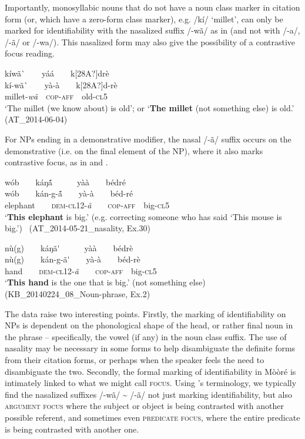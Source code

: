 \documentclass[output=paper]{langsci/langscibook}
\begin{document}
Importantly, monosyllabic nouns that do not have a noun class marker in citation form (or, which have a zero-form class marker), e.g. /kí/ ‘millet’, can only be marked for identifiability with the nasalized suffix /-wã/ as in  (and not with /-a/, /-\~{a}/ or /-wa/). This nasalized form may also give the possibility of a contrastive focus reading.

\ea\label{ex:teo:52}
\label{bkm:Ref264214273}kíw\~{a}\`{ }\ \ \ \ y\'{a}\'{a}\ \ \ \ k[28A?]drè\\
\gll kí\nobreakdash-w\~{a}\`{ }\ \ \ \ y\`{a}-\`{a}\ \ \ \ k[28A?]d\nobreakdash-rè\\
millet\nobreakdash-\textit{wã}\textsc{\ \ cop-aff}\ \ old\nobreakdash-\textsc{cl5}\\
\glt ‘The millet (we know about) is old’; or ‘\textbf{The millet} (not something else) is old.’ (AT\_2014-06-04)
\z

For NPs ending in a demonstrative modifier, the nasal /-ã/ suffix occurs on the demonstrative (i.e. on the final element of the NP), where it also marks contrastive focus, as in  and .

\ea\label{ex:teo:53}
\label{bkm:Ref264214282}wób\ \ \ \ káŋ\'{ã}\ \ \ \ \ \ y\`{a}\`{a}\ \ \ \ bédré\\
\gll wób\ \ \ \ kán\nobreakdash-g\nobreakdash-\'{ã}\ \ \ \ y\`{a}-\`{a}\ \ \ \ béd\nobreakdash-ré\\
elephant\ \ \ \ \textsc{dem-cl12}{}-\textit{ã}\ \ \ \ \textsc{cop-aff}\ \ big\nobreakdash-\textsc{cl5}\\
\glt ‘\textbf{This elephant} is big.’ (e.g. correcting someone who has said ‘This mouse is big.’) \ (AT\_2014-05-21\_nasality, Ex.30)
\z

\ea\label{ex:teo:54}
\label{bkm:Ref432768628}nù(g)\ \ \ \ káŋ\~{a}\'{ }\ \ \ \ \ \ yà\`{a}\ \ \ \ bédrè\\
\gll nù(g)\ \ \ \ kán\nobreakdash-g\nobreakdash-\~{a}\'{ }\ \ \ \ yà-\`{a}\ \ \ \ béd\nobreakdash-rè\\
hand\ \ \ \ \textsc{dem-cl12}\nobreakdash-\textit{ã}\ \ \ \ \textsc{cop-aff}\ \ big-\textsc{cl5}\\
\glt ‘\textbf{This hand }is the one that is big.’ (not something else) (KB\_20140224\_08\_Noun-phrase, Ex.2)
\z

The data raise two interesting points. Firstly, the marking of identifiability on NPs is dependent on the phonological shape of the head, or rather final noun in the phrase – specifically, the vowel (if any) in the noun class suffix. The use of nasality may be necessary in some forms to help disambiguate the definite forms from their citation forms, or perhaps when the speaker feels the need to disambiguate the two. Secondly, the formal marking of identifiability in Mòòré is intimately linked to what we might call \textsc{focus}. Using \cite{Lambrecht1994}'s terminology, we typically find the nasalized suffixes /\nobreakdash-wã/ \~{} /\nobreakdash-ã/ not just marking identifiability, but also \textsc{argument focus} where the subject or object is being contrasted with another possible referent, and sometimes even \textsc{predicate focus}, where the entire predicate is being contrasted with another one.
\end{document}
